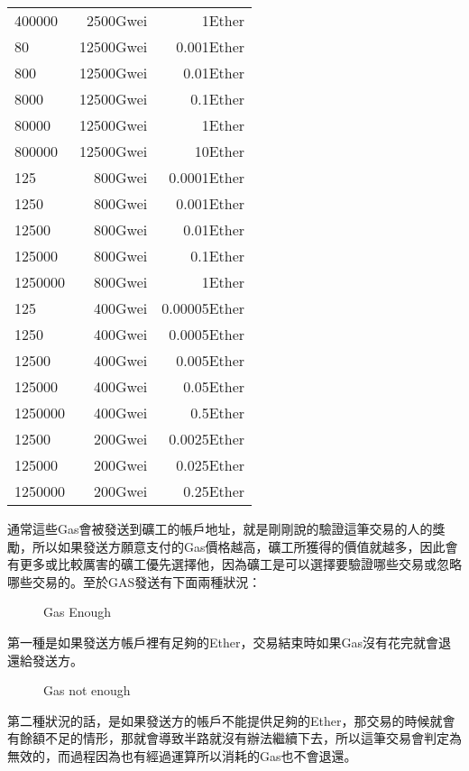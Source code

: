 \documentclass[12pt, a4paper]{article}
\begin{document}
\begin{longtable}{@{}lrr@{}}
400000  &2500Gwei    &1Ether\\
80      &12500Gwei   &0.001Ether\\
800     &12500Gwei   &0.01Ether\\
8000    &12500Gwei   &0.1Ether\\
80000   &12500Gwei   &1Ether\\
800000  &12500Gwei   &10Ether\\
125     &800Gwei     &0.0001Ether\\
1250    &800Gwei     &0.001Ether\\
12500   &800Gwei     &0.01Ether\\
125000  &800Gwei     &0.1Ether\\
1250000 &800Gwei     &1Ether\\
125     &400Gwei     &0.00005Ether\\
1250    &400Gwei     &0.0005Ether\\
12500   &400Gwei     &0.005Ether\\
125000  &400Gwei     &0.05Ether\\
1250000 &400Gwei     &0.5Ether\\
12500   &200Gwei     &0.0025Ether\\
125000  &200Gwei     &0.025Ether\\
1250000 &200Gwei     &0.25Ether\\
\bottomrule
\end{longtable}
通常這些Gas會被發送到礦工的帳戶地址，就是剛剛說的驗證這筆交易的人的獎勵，所以如果發送方願意支付的Gas價格越高，礦工所獲得的價值就越多，因此會有更多或比較厲害的礦工優先選擇他，因為礦工是可以選擇要驗證哪些交易或忽略哪些交易的。至於GAS發送有下面兩種狀況：\\
\begin{figure}[H]
    \caption{Gas Enough}
    \label{fig:Gasenough}
\end{figure}
第一種是如果發送方帳戶裡有足夠的Ether，交易結束時如果Gas沒有花完就會退還給發送方。\\
\begin{figure}[H]
    \caption{Gas not enough}
    \label{fig:Gasnotenough}
\end{figure}
第二種狀況的話，是如果發送方的帳戶不能提供足夠的Ether，那交易的時候就會有餘額不足的情形，那就會導致半路就沒有辦法繼續下去，所以這筆交易會判定為無效的，而過程因為也有經過運算所以消耗的Gas也不會退還。
\end{document}
